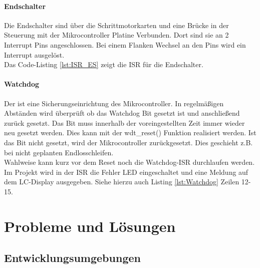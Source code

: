 \subsubsection{Endschalter}
Die Endschalter sind über die Schrittmotorkarten und eine Brücke in der Steuerung mit der Mikrocontroller Platine Verbunden. Dort sind sie an 2 Interrupt Pins angeschlossen.  Bei einem Flanken Wechsel an den Pins wird ein Interrupt ausgelöst. \\
Das Code-Listing \ref{lst:ISR_ES} zeigt die ISR für die Endschalter.
\lstset{language=C, basicstyle=\footnotesize, showstringspaces=false, tabsize=2}

\subsubsection{Watchdog}
Der  ist eine Sicherungseinrichtung des Mikrocontroller. In regelmäßigen Abständen wird überprüft ob das Watchdog Bit gesetzt ist und anschließend zurück gesetzt. Das Bit muss innerhalb der voreingestellten Zeit immer wieder neu gesetzt werden. Dies kann mit der wdt\_reset() Funktion realisiert werden. Ist das Bit nicht gesetzt, wird der Mikrocontroller zurückgesetzt.  Dies geschieht z.B. bei nicht geplanten Endlosschleifen.\\
Wahlweise kann kurz vor dem Reset noch die Watchdog-ISR durchlaufen werden.\\
Im Projekt wird in der ISR die Fehler LED eingeschaltet und eine Meldung auf dem LC-Display ausgegeben. Siehe hierzu auch Listing \ref{lst:Watchdog} Zeilen 12-15.
\lstset{language=C, basicstyle=\footnotesize, showstringspaces=false, tabsize=4}




\chapter{Probleme und Lösungen}
\section{Entwicklungsumgebungen}
